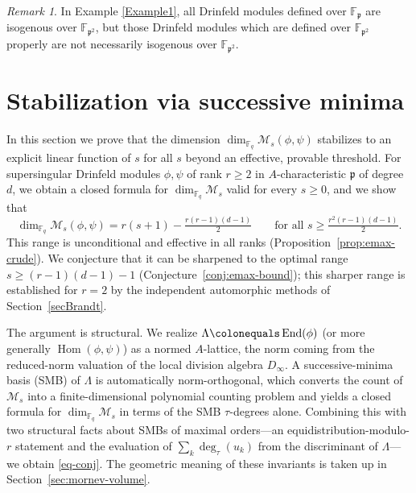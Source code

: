 \documentclass[12pt]{amsart}
\theoremstyle{definition}
\theoremstyle{remark}
\newtheorem{rem}[thm]{Remark}
\numberwithin{equation}{section}
\numberwithin{thm}{section}
\DeclareMathOperator{\Hom}{Hom}
\DeclareMathOperator{\End}{End}
\newcommand{\fp}{\mathfrak{p}}
\newcommand{\cM}{\mathcal{M}}
\newcommand{\F}{\mathbb{F}}
\newcommand{\La}{\Lambda}
\begin{document}
	\begin{rem}
		In Example \ref{Example1}, all
		Drinfeld modules defined over $\F_{\fp}$ are isogenous over $\F_{\fp^2}$, but those Drinfeld modules which are defined over $\F_{\fp^2}$
		properly are not necessarily isogenous over $\F_{\fp^2}$.
	\end{rem}
	
	
	\section{Stabilization via successive minima}\label{sec:smb-stabilization}
	
	In this section we prove that the dimension $\dim_{\F_q}\cM_s(\phi,\psi)$ stabilizes to an 
	explicit linear function of $s$ for all $s$ beyond an effective, provable threshold. For supersingular Drinfeld modules $\phi, \psi$ of rank $r \geq 2$ in $A$-characteristic $\fp$ of degree $d$, we obtain a closed formula for $\dim_{\F_q}\cM_s$ valid for every $s \geq 0$, and we show that
	\begin{equation}\label{eq-conj}
		\dim_{\F_q} \cM_s(\phi,\psi) = r(s+1) - \tfrac{r(r-1)(d-1)}{2} \qquad \text{for all } s \geq \tfrac{r^2(r-1)(d-1)}{2}.
	\end{equation}
	This range is unconditional and effective in all ranks (Proposition~\ref{prop:emax-crude}). We conjecture that it can be sharpened to the optimal range $s \geq (r-1)(d-1) - 1$ (Conjecture~\ref{conj:emax-bound}); this sharper range is established for $r = 2$ by the independent automorphic methods of Section~\ref{secBrandt}.
	
	The argument is structural. We realize $\La \colonequals \End(\phi)$ (or more generally $\Hom(\phi,\psi)$) as a normed $A$-lattice, the norm coming from the reduced-norm valuation of the local division algebra $D_\infty$. A successive-minima basis (SMB) of $\La$ is automatically norm-orthogonal, which converts the count of $\cM_s$ into a finite-dimensional polynomial counting problem and yields a closed formula for $\dim_{\F_q}\cM_s$ in terms of the SMB $\tau$-degrees alone. Combining this with two structural facts about SMBs of maximal orders---an equidistribution-modulo-$r$ statement and the evaluation of $\sum_k \deg_\tau(u_k)$ from the discriminant of $\La$---we obtain \eqref{eq-conj}. The geometric meaning of these invariants is taken up in Section~\ref{sec:mornev-volume}.
	
\end{document}
